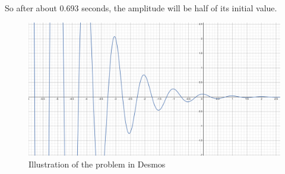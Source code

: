 \documentclass{article}
\begin{document}
So after about 0.693 seconds, the amplitude will be half of its initial value.

\begin{figure}[h]
    \centering
    \includegraphics[width=1\linewidth]{Test2-Graph.png}
    \caption{Illustration of the problem in Desmos}
    \label{fig:enter-label}
\end{figure}
\end{document}
